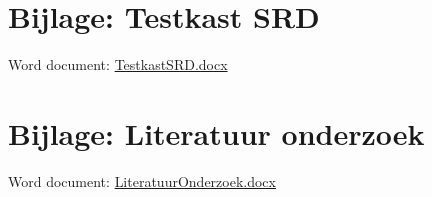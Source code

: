 \appendix

\section{Bijlage: Testkast SRD} \label{sec:TestKastSRD}

Word document: \href{run:TestkastSRD.docx}{TestkastSRD.docx}

\section{Bijlage: Literatuur onderzoek} \label{sec:LiteratuurOnderzoek}

Word document: \href{run:LiteratuurOnderzoek.docx}{LiteratuurOnderzoek.docx}
